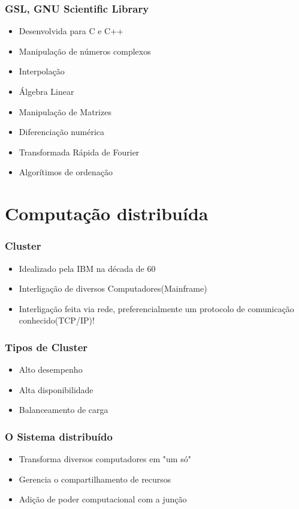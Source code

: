 \documentclass{beamer}
\begin{document}
\begin{frame}
    \frametitle{GSL, GNU Scientific Library}

    \begin{itemize}
        \item Desenvolvida para C e C++
        \item Manipulação de números complexos
        \item Interpolação
        \item Álgebra Linear
        \item Manipulação de Matrizes
        \item Diferenciação numérica
        \item Transformada Rápida de Fourier
        \item Algorítimos de ordenação
    \end{itemize}
\end{frame}

\section{Computação distribuída}

\begin{frame}
    \frametitle{Cluster}

\begin{itemize}
    \item Idealizado pela IBM na década de 60
    \item Interligação de diversos Computadores(Mainframe)
    \item Interligação feita via rede, preferencialmente um protocolo de comunicação conhecido(TCP/IP)!
\end{itemize}
\end{frame}

\begin{frame}
    \frametitle{Tipos de Cluster}

\begin{itemize}
    \item Alto desempenho
    \item Alta disponibilidade
    \item Balanceamento de carga
\end{itemize}

\end{frame}

\begin{frame}
    \frametitle{O Sistema distribuído}

\begin{itemize}
    \item Transforma diversos computadores em "um só"
    \item Gerencia o compartilhamento de recursos
    \item Adição de poder computacional com a junção
\end{itemize}
\end{frame}
\end{document}
